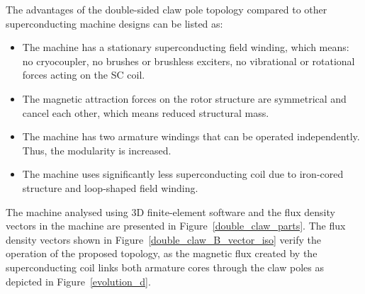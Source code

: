 \documentclass[12pt]{iopart}
\begin{document}
The advantages of the double-sided claw pole topology compared to other superconducting machine designs can be listed as:

\begin{itemize}
  \item The machine has a stationary superconducting field winding, which means: no cryocoupler, no brushes or brushless exciters, no vibrational or rotational forces acting on the SC coil.
  \item The magnetic attraction forces on the rotor structure are symmetrical and cancel each other, which means reduced structural mass.
  \item The machine has two armature windings that can be operated independently. Thus, the modularity is increased.
  \item The machine uses significantly less superconducting coil due to iron-cored structure and loop-shaped field winding.
\end{itemize}

The machine analysed using 3D finite-element software and the flux density vectors in the machine are presented in Figure~\ref{double_claw_parts}. The flux density vectors shown in Figure~\ref{double_claw_B_vector_iso} verify the operation of the proposed topology, as the magnetic flux created by the superconducting coil links both armature cores through the claw poles as depicted in Figure~\ref{evolution_d}.
\end{document}
